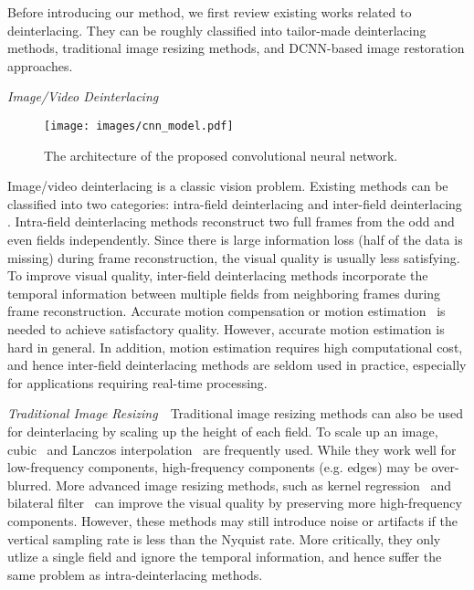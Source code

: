 Before introducing our method, we first review existing works related to 
deinterlacing. They can be roughly classified into tailor-made 
deinterlacing methods,  traditional image resizing methods, and DCNN-based
image restoration approaches.

\vspace{0.15in}
\noindent\emph{Image/Video Deinterlacing}\,\,\,\,
\begin{figure*}[!tp]
  \texttt{[image: images/cnn\_model.pdf]}\\
  \caption{The architecture of the proposed convolutional neural network.}\label{fig:cnn_model}
\end{figure*}
Image/video deinterlacing is a classic  vision problem. 
Existing methods can be classified into two categories: intra-field deinterlacing
\cite{doyle1990interlaced,wang2012efficient,wang2013moving} and inter-field
deinterlacing \cite{jeon2009weighted,mohammadi2012enhanced,lee2013high}. 
Intra-field deinterlacing methods reconstruct two full frames from the odd and even fields
independently. Since
there is large information loss (half of the data is missing) during frame
reconstruction, the visual quality is usually less satisfying. To improve visual
quality, inter-field deinterlacing methods incorporate the temporal
information between multiple fields from neighboring frames during frame
reconstruction. Accurate motion compensation or motion
estimation~\cite{horn1981determining} is needed to achieve satisfactory quality. However, 
accurate motion estimation is hard in general. In
addition, motion estimation requires high computational cost, and hence inter-field
deinterlacing methods are seldom used in practice, especially for applications
requiring real-time processing.

\vspace{0.15in}
\noindent\emph{Traditional Image Resizing}\,\,\,\,
Traditional image resizing
methods can also be used for deinterlacing by scaling up the height of each field.
To scale up an image, cubic~\cite{mitchell1988reconstruction} and
Lanczos interpolation~\cite{duchon1979lanczos} are frequently used. While they work well for low-frequency components, high-frequency components 
(e.g. edges) may be over-blurred. More advanced image resizing methods, 
such as kernel regression~\cite{takeda2007kernel} and
bilateral filter~\cite{hung2012fast} can improve the
visual quality by preserving more high-frequency components. 
However, these methods may still introduce noise or artifacts 
if the vertical sampling rate is less than the Nyquist rate. 
More critically, they only utlize a single field and ignore the temporal information, 
and hence suffer the same problem as intra-deinterlacing methods.

